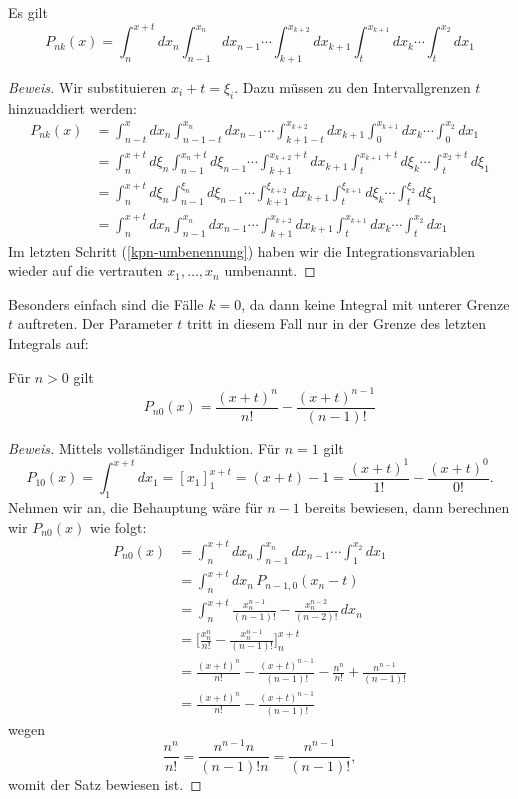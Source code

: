 \begin{satz}
\label{kn-variablentransformation}
Es gilt
\begin{equation}
P_{nk}(x)=\int_{n}^{x+t}dx_n\int_{n-1}^{x_n}dx_{n-1}\dotsi\int_{k+1}^{x_{k+2}}dx_{k+1}\int_t^{x_{k+1}}dx_k\dotsi\int_t^{x_2}dx_1
\label{kpn-variablen-transformation}
\end{equation}
\end{satz}
\begin{proof}[Beweis]
Wir substituieren $x_i+t=\xi_i$.
Dazu müssen zu den Intervallgrenzen
$t$ hinzuaddiert werden:
\begin{align}
P_{nk}(x)
&=
\int_{n-t}^xdx_n\int_{n-1-t}^{x_n}dx_{n-1}\dotsi\int_{k+1-t}^{x_{k+2}}dx_{k+1}\int_0^{x_{k+1}}dx_k\dotsi\int_0^{x_2}dx_1
\nonumber\\
&=
\int_{n}^{x+t}d\xi_n\int_{n-1}^{x_n+t}d\xi_{n-1}\dotsi\int_{k+1}^{x_{k+2}+t}dx_{k+1}\int_t^{x_{k+1}+t}d\xi_k\dotsi\int_t^{x_2+t}d\xi_1
\nonumber\\
&=
\int_{n}^{x+t}d\xi_n\int_{n-1}^{\xi_n}d\xi_{n-1}\dotsi\int_{k+1}^{\xi_{k+2}}dx_{k+1}\int_t^{\xi_{k+1}}d\xi_k\dotsi\int_t^{\xi_2}d\xi_1
\nonumber\\
&=
\int_{n}^{x+t}dx_n\int_{n-1}^{x_n}dx_{n-1}\dotsi\int_{k+1}^{x_{k+2}}dx_{k+1}\int_t^{x_{k+1}}dx_k\dotsi\int_t^{x_2}dx_1
\label{kpn-umbenennung}
\end{align}
Im letzten Schritt (\ref{kpn-umbenennung}) haben wir die Integrationsvariablen
wieder auf die vertrauten $x_1,\dots,x_n$ umbenannt.
\end{proof}
Besonders einfach sind die Fälle $k=0$, da dann keine Integral mit
unterer Grenze $t$ auftreten.
Der Parameter $t$ tritt in diesem Fall nur
in der Grenze des letzten Integrals auf:

\begin{satz}Für $n>0$ gilt
\begin{equation}
P_{n0}(x)=\frac{(x+t)^n}{n!}-\frac{(x+t)^{n-1}}{(n-1)!}
\end{equation}
\end{satz}
\begin{proof}[Beweis]
Mittels vollständiger Induktion.
Für $n=1$ gilt
\[
P_{10}(x)=\int_1^{x+t}dx_1=[x_1]_1^{x+t}=(x+t)-1=\frac{(x+t)^1}{1!}-\frac{(x+t)^0}{0!}.
\]
Nehmen wir an, die Behauptung wäre für $n-1$ bereits bewiesen, dann
berechnen wir $P_{n0}(x)$ wie folgt:
\begin{align*}
P_{n0}(x)
&=
\int_n^{x+t}dx_n\int_{n-1}^{x_n}dx_{n-1}\dotsi\int_1^{x_2}dx_1
\\
&=
\int_n^{x+t}dx_n\,P_{n-1,0}(x_n-t)
\\
&=
\int_n^{x+t}\frac{x_n^{n-1}}{(n-1)!}-\frac{x_n^{n-2}}{(n-2)!}\,dx_n
\\
&=
\biggl[\frac{x_n^n}{n!}-\frac{x_n^{n-1}}{(n-1)!}\biggr]_n^{x+t}
\\
&=
\frac{(x+t)^n}{n!}-\frac{(x+t)^{n-1}}{(n-1)!}
-\frac{n^n}{n!}+\frac{n^{n-1}}{(n-1)!}
\\
&=
\frac{(x+t)^n}{n!}-\frac{(x+t)^{n-1}}{(n-1)!}
\end{align*}
wegen
\[
\frac{n^n}{n!}=\frac{n^{n-1}n}{(n-1)! n}=\frac{n^{n-1}}{(n-1)!},
\]
womit der Satz bewiesen ist.
\end{proof}

